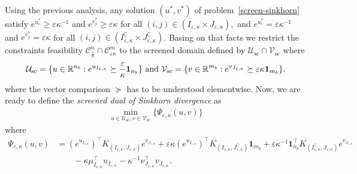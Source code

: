 Using the previous analysis, any solution $(u^*, v^*)$ of problem~\eqref{screen-sinkhorn} satisfy $e^{u^*_i} \geq \varepsilon\kappa^{-1}$ and $e^{v^*_j} \geq \varepsilon\kappa$ for all $(i,j) \in (I_{\varepsilon,\kappa}\times J_{\varepsilon,\kappa}),$ and $e^{u^*_i} = \varepsilon\kappa^{-1}$ and $e^{v^*_j} = \varepsilon\kappa$ for all $(i,j) \in (I^\complement_{\varepsilon,\kappa}\times J^\complement_{\varepsilon,\kappa})$.
Basing on that facts we restrict the constraints feasibility $\mathcal{C}^n_{\frac \varepsilon \kappa} \cap \mathcal{C}^m_{\varepsilon\kappa}$ to the screened domain defined by $\mathcal{U}_{\text{sc}} \cap \mathcal{V}_{\text{sc}}$ where 
\begin{equation*}
\mathcal{U}_{\text{sc}} = \{u \in \R^{n_b}: e^{u_{I_{\varepsilon,\kappa}}} \succeq \frac \varepsilon\kappa\mathbf 1_{n_b}\} \text{ and } \mathcal{V}_{\text{sc}} =\{v\in\R^{m_b}: e^{v_{J_{\varepsilon,\kappa}}} \succeq \varepsilon\kappa \mathbf{1}_{m_b}\}.%
\end{equation*}
where the vector comparison $\succeq$ has to be understood elementwise.
Now, we are ready to define the \emph{screened dual of Sinkhorn divergence} as
\begin{align}
\label{screen-sinkhorn_second_def}
\min_{u \in \mathcal{U}_{\text{sc}}, v \in \mathcal{V}_{\text{sc}}}\{\Psi_{\varepsilon, \kappa}(u,v)\}
\end{align}
where 
\begin{align*} 
\Psi_{\varepsilon,\kappa}(u, v) &= (e^{u_{I_{\varepsilon,\kappa}}})^\top K_{(I_{\varepsilon,\kappa}, J_{\varepsilon,\kappa})} e^{v_{J_{\varepsilon,\kappa}}} + 
\varepsilon \kappa (e^{u_{I_{\varepsilon,\kappa}}})^\top K_{(I_{\varepsilon,\kappa}, J^\complement_{\varepsilon,\kappa})}\mathbf 1_{m_b} + \varepsilon \kappa^{-1} \mathbf 1_{n_b}^\top K_{(I^\complement_{\varepsilon,\kappa}, J_{\varepsilon,\kappa})}e^{v_{J_{\varepsilon,\kappa}}}\\
&\qquad - \kappa \mu_{I_{\varepsilon,\kappa}}^\top u_{I_{\varepsilon,\kappa}} - \kappa^{-1} \nu_{J_{\varepsilon,\kappa}}^\top v_{J_{\varepsilon,\kappa}}. %
\end{align*}

